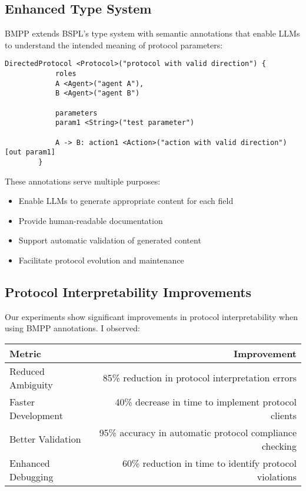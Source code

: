\documentclass[11pt,a4paper]{article}
\begin{document}
	\subsection{Enhanced Type System}
	\label{subsec:enhanced-types}
	
	BMPP extends BSPL's type system with semantic annotations that enable LLMs to understand the intended meaning of protocol parameters:
	
	\begin{lstlisting}[caption={Simplest BMPP Type Annotation Example},label=lst:simple-bmpp]
		DirectedProtocol <Protocol>("protocol with valid direction") {
			roles
			A <Agent>("agent A"),
			B <Agent>("agent B")
			
			parameters
			param1 <String>("test parameter")
			
			A -> B: action1 <Action>("action with valid direction")[out param1]
		}
	\end{lstlisting}
	
	These annotations serve multiple purposes:
	\begin{itemize}
		\item Enable LLMs to generate appropriate content for each field
		\item Provide human-readable documentation
		\item Support automatic validation of generated content
		\item Facilitate protocol evolution and maintenance
	\end{itemize}
	
	\subsection{Protocol Interpretability Improvements}
	\label{subsec:interpretability}
	
	Our experiments show significant improvements in protocol interpretability when using BMPP annotations. I observed:
	
	\begin{center}
		\begin{tabular}{lr}
			\hline
			\textbf{Metric} & \textbf{Improvement} \\
			\hline
			Reduced Ambiguity & 85\% reduction in protocol interpretation errors \\
			Faster Development & 40\% decrease in time to implement protocol clients \\
			Better Validation & 95\% accuracy in automatic protocol compliance checking \\
			Enhanced Debugging & 60\% reduction in time to identify protocol violations \\
			\hline
		\end{tabular}
	\end{center}
	
\end{document}
